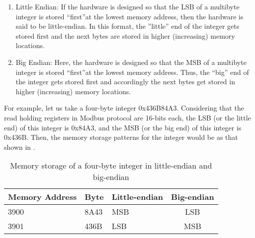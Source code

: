 \begin{enumerate}
  \item Little Endian:
        If the hardware is designed so that the LSB of a multibyte integer is stored ``first''at the lowest memory address, then the hardware is said to be little-endian. In this format, the ''little'' end of the integer gets stored
        first and the next bytes are stored in higher (increasing) memory
        locations.  
  \item Big Endian:
        Here, the hardware is designed so that the MSB of a multibyte integer is stored ``first''at the lowest memory address. Thus, the ``big'' end of the integer gets
        stored first and accordingly the next bytes get stored in higher
        (increasing) memory locations.  
\end{enumerate}
For example, let us take a four-byte integer 0x436B84A3. Considering 
that the read holding registers in Modbus protocol are 16-bits each, the 
LSB (or the little end) of this integer is 0x84A3, and the MSB (or the big end) 
of this integer is 0x436B.  Then, the memory storage patterns
for the integer would be as that shown in .
\begin{table}
  \centering
  \caption{Memory storage of a four-byte integer in little-endian and big-endian}
  \label{tab:memory-storage}
  \begin{tabular}{lllc}\hline
    Memory Address & Byte & Little-endian & Big-endian \\ \hline
    3900           & 8A43 & MSB           & LSB        \\
    3901           & 436B & LSB           & MSB        \\ 
    \hline
  \end{tabular}
\end{table}




